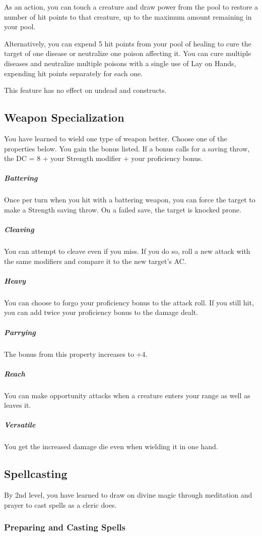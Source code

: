 As an action, you can touch a creature and draw power from the pool to restore a number of hit points to that creature, up to the maximum amount remaining in your pool.

Alternatively, you can expend 5 hit points from your pool of healing to cure the target of one disease or neutralize one poison affecting it. You can cure multiple diseases and neutralize multiple poisons with a single use of Lay on Hands, expending hit points separately for each one.

This feature has no effect on undead and constructs.

\subsection{Weapon Specialization}

You have learned to wield one type of weapon better. Choose one of the properties below. You gain the bonus listed. If a bonus calls for a saving throw, the DC = 8 + your Strength modifier + your proficiency bonus.

\subparagraph*{Battering} Once per turn when you hit with a battering weapon, you can force the target to make a Strength saving throw. On a failed save, the target is knocked prone.

\subparagraph*{Cleaving} You can attempt to cleave even if you miss. If you do so, roll a new attack with the same modifiers and compare it to the new target's AC.

\subparagraph*{Heavy} You can choose to forgo your proficiency bonus to the attack roll. If you still hit, you can add twice your proficiency bonus to the damage dealt.

\subparagraph*{Parrying} The bonus from this property increases to +4.

\subparagraph*{Reach} You can make opportunity attacks when a creature enters your range as well as leaves it.

\subparagraph*{Versatile} You get the increased damage die even when wielding it in one hand.

\subsection{Spellcasting}

By 2nd level, you have learned to draw on divine magic through meditation and prayer to cast spells as a cleric does.

\subsubsection{Preparing and Casting Spells}

